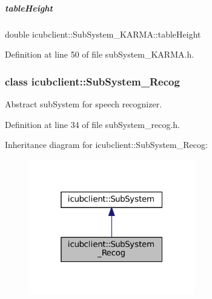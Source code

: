 \mbox{\label{group__icubclient__subsystems_add03e20b9b8be1dad5999fb47e572679}} 
\subparagraph{\texorpdfstring{table\+Height}{tableHeight}}
{\footnotesize\ttfamily double icubclient\+::\+Sub\+System\+\_\+\+K\+A\+R\+M\+A\+::table\+Height\hspace{0.3cm}{\ttfamily [protected]}}



Definition at line 50 of file sub\+System\+\_\+\+K\+A\+R\+M\+A.\+h.

\label{classicubclient_1_1SubSystem__Recog}
\subsubsection{class icubclient\+:\+:Sub\+System\+\_\+\+Recog}
Abstract sub\+System for speech recognizer. 

Definition at line 34 of file sub\+System\+\_\+recog.\+h.



Inheritance diagram for icubclient\+:\+:Sub\+System\+\_\+\+Recog\+:
\nopagebreak
\begin{figure}[H]
\begin{center}
\leavevmode
\includegraphics[width=205pt]{classicubclient_1_1SubSystem__Recog__inherit__graph}
\end{center}
\end{figure}
